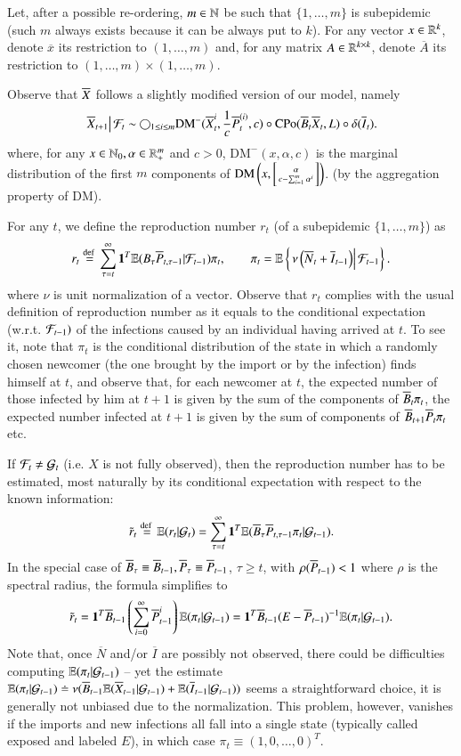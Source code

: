 \documentclass[english]{elsarticle}
\theoremstyle{plain}
\theoremstyle{remark}
\theoremstyle{plain}
\theoremstyle{definition}
\begin{document}
Let, after a possible re-ordering, $m\in\mathbb{N}$ be such that $\{1,\dots,m\}$
is subepidemic (such $m$ always exists because it can be always put
to $k$). For any vector $x\in\mathbb{R}^{k}$, denote $\overline{x}$ its
restriction to $(1,\dots,m)$ and, for any matrix $A\in\mathbb{R}^{k\times k}$,
denote $\overline{A}$ its restriction to $(1,\dots,m)\times(1,\dots,m)$.

Observe that $\overline{X}$ follows a slightly modified version of our model,
namely 
\[
\left.\overline{X}_{t+1}\right|\mathcal{F}_{t}\sim\bigcirc_{1\leq i\leq m}\mathrm{DM}^{-}(\overline{X}_{t}^{i},\frac{1}{c}\overline{P}_{t}^{(i)},c)\circ\mathrm{CPo}(\overline{B}_{t}\overline{X}_{t},L)\circ\delta(\overline{I}_{t}).
\]
where, for any $x\in\mathbb{N}_{0},\alpha\in\mathbb{R}_{+}^{m}$ and $c>0$, $\mathrm{DM}^{-}(x,\alpha,c)$
is the marginal distribution of the first $m$ components of $\mathrm{DM}\left(x,\left[{\alpha\atop c-\sum_{i=1}^{m}\alpha^{i}}\right]\right)$.
(by the aggregation property of $\mathrm{DM}$).

For any $t$, we define the reproduction number $r_{t}$ (of a subepidemic
$\{1,\dots,m\}$) as 
\[
r_{t}\stackrel{\text{def }}{=}\sum_{\tau=t}^{\infty}\mathbf{1}^{T}\mathbb{E}(B_{\tau}\overline{P}_{t,\tau-1}|\mathcal{F}_{t-1})\pi_{t},\qquad\pi_{t}=\mathbb{E}\left\{ \left.\nu\left(\overline{N}_{t}+\overline{I}_{t-1}\right)\right|\mathcal{F}_{t-1}\right\} .
\]
where $\nu$ is unit normalization of a vector. Observe that $r_{t}$
complies with the usual definition of reproduction number as it equals
to the conditional expectation (w.r.t. $\mathcal{F}_{t-1})$ of the infections
caused by an individual having arrived at $t$. To see it, note that
$\pi_{t}$ is the conditional distribution of the state in which a
randomly chosen newcomer (the one brought by the import or by the
infection) finds himself at $t$, and observe that, for each newcomer
at $t$, the expected number of those infected by him at $t+1$ is
given by the sum of the components of $\overline{B}{}_{t}\pi_{t}$, the expected
number infected at $t+1$ is given by the sum of components of $\overline{B}_{t+1}\overline{P}_{t}\pi_{t}$
etc.

If $\mathcal{F}_{t}\neq\mathcal{G}_{t}$ (i.e. $X$ is not fully observed), then the
reproduction number has to be estimated, most naturally by its conditional
expectation with respect to the known information: 
\[
\tilde{r}_{t}\stackrel{\text{def }}{=}\mathbb{E}(r_{t}|\mathcal{G}_{t})=\sum_{\tau=t}^{\infty}\mathbf{1}^{T}\mathbb{E}(\overline{B}_{\tau}\overline{P}_{t,\tau-1}\pi_{t}|\mathcal{G}_{t-1}).
\]
In the special case of $\overline{B}_{\tau}\equiv\overline{B}_{t-1},\overline{P}_{\tau}\equiv\overline{P}_{t-1}$,
$\tau\geq t$, with $\rho(\overline{P}_{t-1})<1$ where $\rho$ is the spectral
radius, the formula simplifies to
\[
\tilde{r}_{t}=\mathbf{1}^{T}\overline{B}_{t-1}\left(\sum_{i=0}^{\infty}\overline{P}_{t-1}^{i}\right)\mathbb{E}(\pi_{t}|\mathcal{G}_{t-1})=\mathbf{1}^{T}\overline{B}_{t-1}(E-\overline{P}_{t-1})^{-1}\mathbb{E}(\pi_{t}|\mathcal{G}_{t-1}).
\]
Note that, once $\overline{N}$ and/or $\overline{I}$ are possibly
not observed, there could be difficulties computing $\mathbb{E}(\pi_{t}|\mathcal{G}_{t-1})$
-- yet the estimate $\mathbb{E}(\pi_{t}|\mathcal{G}_{t-1})\doteq\nu(\overline{B}_{t-1}\mathbb{E}(\overline{X}_{t-1}|\mathcal{G}_{t-1})+\mathbb{E}(\overline{I}_{t-1}|\mathcal{G}_{t-1}))$
seems a straightforward choice, it is generally not unbiased due to
the normalization. This problem, however, vanishes if the imports
and new infections all fall into a single state (typically called
exposed and labeled $E$), in which case $\pi_{t}\equiv(1,0,\dots,0)^{T}$.
\end{document}

